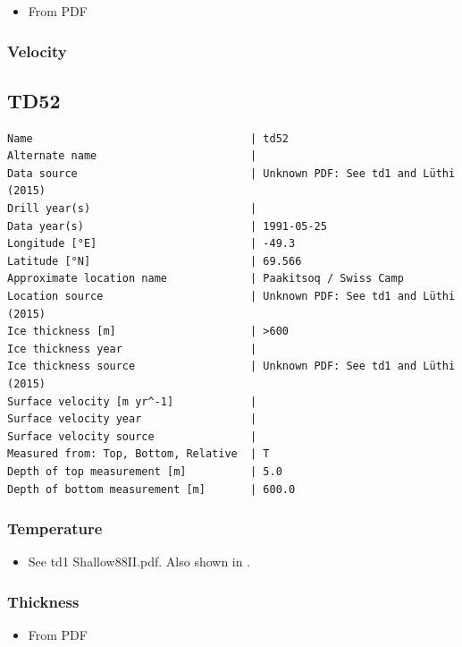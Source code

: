 \documentclass[article,a4paper,times,11pt,twoside]{article}
\begin{document}
\begin{itemize}
\item From PDF
\end{itemize}

\subsubsection{Velocity}
\label{sec:orgdcbb70c}
\clearpage
\subsection{TD52}
\label{sec:org2beaf5a}
\begin{verbatim}
Name                                  | td52
Alternate name                        | 
Data source                           | Unknown PDF: See td1 and Lüthi (2015)
Drill year(s)                         | 
Data year(s)                          | 1991-05-25
Longitude [°E]                        | -49.3
Latitude [°N]                         | 69.566
Approximate location name             | Paakitsoq / Swiss Camp
Location source                       | Unknown PDF: See td1 and Lüthi (2015)
Ice thickness [m]                     | >600
Ice thickness year                    | 
Ice thickness source                  | Unknown PDF: See td1 and Lüthi (2015)
Surface velocity [m yr^-1]            | 
Surface velocity year                 | 
Surface velocity source               | 
Measured from: Top, Bottom, Relative  | T
Depth of top measurement [m]          | 5.0
Depth of bottom measurement [m]       | 600.0
\end{verbatim}

\subsubsection{Temperature}
\label{sec:orgc742ef8}

\begin{itemize}
\item See td1 Shallow88II.pdf. Also shown in \textcite{luthi_2015}.
\end{itemize}

\subsubsection{Thickness}
\label{sec:orgee81dc2}

\begin{itemize}
\item From PDF
\end{itemize}
\end{document}
